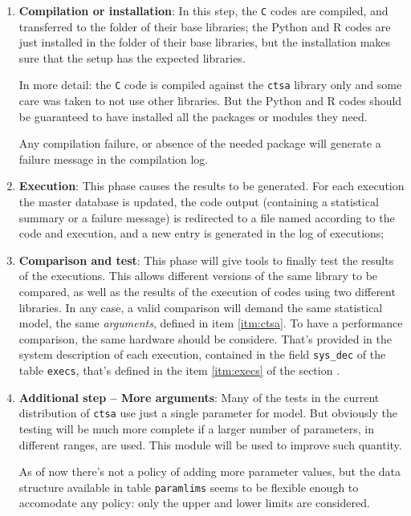 \documentclass[a4paper,10pt]{article}
\begin{document}
\begin{enumerate}
        They will be compiled or simply installed in the next
        step (item \ref{itm:compilation});

    \item \label{itm:compilation}
        {\bf Compilation or installation}: In this step, the
        {\tt C} codes are compiled, and transferred to the
        folder of their base libraries; the Python and R codes
        are just installed in the folder of their base libraries,
        but the installation makes sure that the setup has the
        expected libraries.

        In more detail: the {\tt C} code is compiled against the
        {\tt ctsa} library only and some care was taken to not use
        other libraries. But the Python and R codes should
        be guaranteed to have installed all the packages or
        modules they need.

        Any compilation failure, or absence of the needed package
        will generate a failure message in the compilation log.

    \item \label{itm:execution}
        {\bf Execution}: This phase causes the results to be
        generated. For each execution the master database is
        updated, the code output (containing a statistical summary
        or a failure message) is redirected to a file named
        according to the code and execution, and a new entry is
        generated in the log of executions;

    \item \label{itm:comparison}
        {\bf Comparison and test}: This phase will give tools to
        finally test the results of the executions. This allows
        different versions of the same library to be compared,
        as well as the results of the execution of codes using
        two different libraries. In any case, a valid comparison
        will demand the same statistical model, the same
        {\em arguments}, defined in item \ref{itm:ctsa}. To have
        a performance comparison, the same hardware should be
        considere. That's provided in the system description of
        each execution, contained in the field {\tt sys\_dec} of
        the table {\tt execs}, that's defined in the item
        \ref{itm:execs} of the section .

    \item \label{itm:more_arguments}
        {\bf Additional step -- More arguments}:
        Many of the tests in the current distribution of
        {\tt ctsa} use just a single parameter for model. But
        obviously the testing will be much more complete if a
        larger number of parameters, in different ranges, are
        used. This module will be used to improve such quantity.

        As of now there's not a policy of adding more parameter
        values, but the data structure available in table
        {\tt paramlims} seems to be flexible enough to accomodate
        any policy:  only the upper and lower limits are
        considered.

\end{enumerate}
\end{document}
